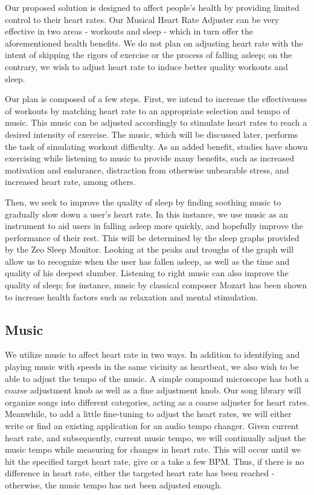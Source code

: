 \documentclass[letterpaper,english, 12pt]{scrreprt}
\begin{document}
Our proposed solution is designed to affect people's health by providing limited control to their heart rates. Our Musical Heart Rate Adjuster can be very effective in two areas - workouts and sleep - which in turn offer the aforementioned health benefits. We do not plan on adjusting heart rate with the intent of skipping the rigors of exercise or the process of falling asleep; on the contrary, we wish to adjust heart rate to induce better quality workouts and sleep.
			 
Our plan is composed of a few steps. First, we intend to increase the effectiveness of workouts by matching heart rate to an appropriate selection and tempo of music. This music can be adjusted accordingly to stimulate heart rates to reach a desired intensity of exercise. The music, which will be discussed later, performs the task of simulating workout difficulty. As an added benefit, studies have shown exercising while listening to music to provide many benefits, such as increased motivation and endurance, distraction from otherwise unbearable stress, and increased heart rate, among others.
			 
Then, we seek to improve the quality of sleep by finding soothing music to gradually slow down a user's heart rate. In this instance, we use music as an instrument to aid users in falling asleep more quickly, and hopefully improve the performance of their rest. This will be determined by the sleep graphs provided by the Zeo Sleep Monitor. Looking at the peaks and troughs of the graph will allow us to recognize when the user has fallen asleep, as well as the time and quality of his deepest slumber. Listening to right music can also improve the quality of sleep; for instance, music by classical composer Mozart has been shown to increase health factors such as relaxation and mental stimulation.
			 
\subsection{Music}
We utilize music to affect heart rate in two ways. In addition to identifying and playing music with speeds in the same vicinity as heartbeat, we also wish to be able to adjust the tempo of the music. A simple compound microscope has both a coarse adjustment knob as well as a fine adjustment knob. Our song library will organize songs into different categories, acting as a coarse adjuster for heart rates. Meanwhile, to add a little fine-tuning to adjust the heart rates, we will either write or find an existing application for an audio tempo changer. Given current heart rate, and subsequently, current music tempo, we will continually adjust the music tempo while measuring for changes in heart rate. This will occur until we hit the specified target heart rate, give or a take a few BPM. Thus, if there is no difference in heart rate, either the targeted heart rate has been reached - otherwise,  the music tempo has not been adjusted enough.
			 
\end{document}

